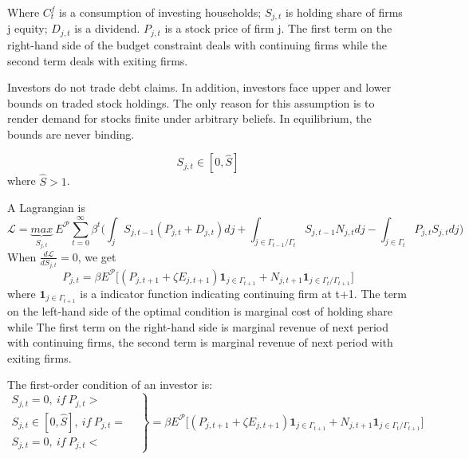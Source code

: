 \documentclass[10pt,math=newtx,citestyle=gb7714-2015,bibstyle=gb7714-2015]{elegantbook}
\begin{document}
{{{	Where $C_t^f$ is a consumption of investing households; $S_{j,t}$ is holding share of firms j equity;  $D_{j,t}$ is a dividend. $P_{j,t}$ is a stock price of firm j. The first term on the right-hand side of the budget constraint deals with continuing firms while the second term deals with exiting firms.
	
	Investors do not trade debt claims. In addition, investors face upper and lower bounds on traded stock holdings. The only reason for this assumption is to render demand for stocks finite under arbitrary beliefs. In equilibrium, the bounds are never binding.
	
	\begin{equation}
		S_{j,t} \in [0, \hat{S}]
	\end{equation}
	where $\hat{S}>1$.
	
	A Lagrangian is
	\begin{equation*}
		\mathcal{L}=\underbrace{max}_{S_{j,t}}~\mathit{E}^{\mathcal{P}} \sum_{t=0}^{\infty}\beta^t\bigg(\int_jS_{j,t-1}(P_{j,t}+D_{j,t})dj+\int_{j \in \varGamma_{t-1}/\varGamma_t} S_{j,t-1}N_{j,t}dj-\int_{j \in \varGamma_t} P_{j,t}S_{j,t}dj\bigg)
	\end{equation*}
	When $\frac{d\mathcal{L}}{dS_{j,t}}=0$, we get
	\begin{equation*}
		P_{j,t}=\beta\mathit{E}^{\mathcal{P}}\big[(P_{j,t+1}+\zeta E_{j,t+1}){\mathbf{1}_{j\in \varGamma_{t+1}}+N_{j,t+1}\mathbf{1}_{j\in \varGamma_t/\varGamma_{t+1}}\big]}
		\end{equation*}
		where $\mathbf{1}_{j\in \varGamma_{t+1}}$ is a indicator function indicating continuing firm at t+1. The term on the left-hand side of the optimal condition is marginal cost of holding share while The first term on the right-hand side is marginal revenue of next period with continuing firms, the second term is marginal revenue of next period with exiting firms.
		
		
		The first-order condition of an investor is:
		\begin{equation}
			\left.
			\begin{array}{lr}
				S_{j,t}=0, ~if~ P_{j,t}>&  \\
				S_{j,t}\in [0, \hat{S}],~ if~ P_{j,t}=\\
				S_{j,t}=0, ~if~ P_{j,t}< &  
			\end{array}
			\right\}=\beta\mathit{E}^{\mathcal{P}}\big[(P_{j,t+1}+\zeta E_{j,t+1}){\mathbf{1}_{j\in \varGamma_{t+1}}+N_{j,t+1}\mathbf{1}_{j\in \varGamma_t/\varGamma_{t+1}}\big]}
			\end{equation}
			
}}}
\end{document}
